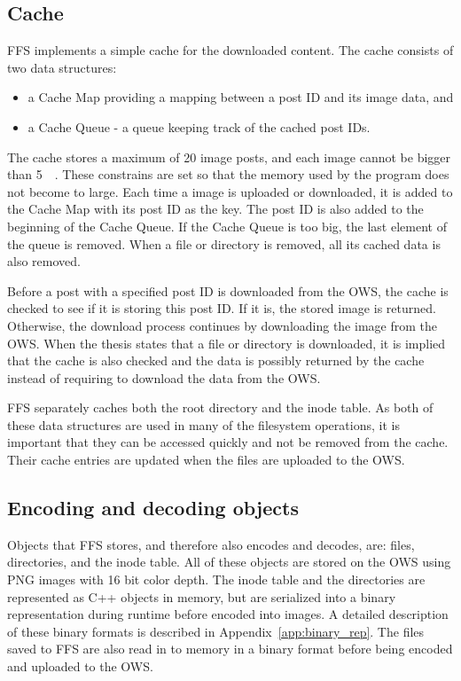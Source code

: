 \subsection{Cache}
FFS implements a simple cache for the downloaded content. The cache consists of two data structures: 
\begin{itemize}
	\item a Cache Map providing a mapping between a post ID and its image data, and
	\item a Cache Queue - a queue keeping track of the cached post IDs.
\end{itemize}
The cache stores a maximum of 20 image posts, and each image cannot be bigger than \SI{5}{\mega\byte}. These constrains are set so that the memory used by the program does not become to large. Each time a image is uploaded or downloaded, it is added to the Cache Map with its post ID as the key. The post ID is also added to the beginning of the Cache Queue. If the Cache Queue is too big, the last element of the queue is removed. When a file or directory is removed, all its cached data is also removed.

Before a post with a specified post ID is downloaded from the OWS, the cache is checked to see if it is storing this post ID. If it is, the stored image is returned. Otherwise, the download process continues by downloading the image from the OWS. When the thesis states that a file or directory is downloaded, it is implied that the cache is also checked and the data is possibly returned by the cache instead of requiring to download the data from the OWS.

FFS separately caches both the root directory and the inode table. As both of these data structures are used in many of the filesystem operations, it is important that they can be accessed quickly and not be removed from the cache. Their cache entries are updated when the files are uploaded to the OWS.

\subsection{Encoding and decoding objects}
\label{subsec:file_enc_dec}
Objects that FFS stores, and therefore also encodes and decodes, are: files, directories, and the inode table. All of these objects are stored on the OWS using PNG images with 16 bit color depth. The inode table and the directories are represented as C++ objects in memory, but are serialized into a binary representation during runtime before encoded into images. A detailed description of these binary formats is described in Appendix~\ref{app:binary_rep}. The files saved to FFS are also read in to memory in a binary format before being encoded and uploaded to the OWS. 

